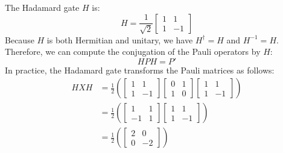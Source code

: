 \highspace
\begin{examplebox}
    The Hadamard gate $H$ is:
    \begin{equation*}
        H = \frac{1}{\sqrt{2}}
        \begin{bmatrix}
            1 & 1 \\
            1 & -1
        \end{bmatrix}
    \end{equation*}
    Because $H$ is both Hermitian and unitary, we have $H^\dagger = H$ and $H^{-1} = H$. Therefore, we can compute the conjugation of the Pauli operators by $H$:
    \begin{equation*}
        H P H = P'
    \end{equation*}
    In practice, the Hadamard gate transforms the Pauli matrices as follows:
    \begin{equation}\label{eq:hadamard-conjugation}
        \begin{aligned}
            H X H &= 
            \frac{1}{2}
            \left(\begin{bmatrix}
                1 & 1 \\
                1 & -1
            \end{bmatrix}
            \begin{bmatrix}
                0 & 1 \\
                1 & 0
            \end{bmatrix}
            \begin{bmatrix}
                1 & 1 \\
                1 & -1
            \end{bmatrix}\right) \\
            &=
            \frac{1}{2}
            \left(\begin{bmatrix}
                1 & 1 \\
                -1 & 1
            \end{bmatrix}
            \begin{bmatrix}
                1 & 1 \\
                1 & -1
            \end{bmatrix}\right) \\
            &=
            \frac{1}{2}
            \left(\begin{bmatrix}
                2 & 0 \\
                0 & -2
            \end{bmatrix}\right) \\

\end{aligned}
\end{equation}
\end{examplebox}
